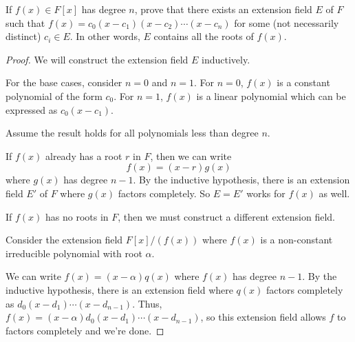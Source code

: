 \documentclass[../hw7]{subfiles}
\begin{document}
\begin{problem}
If $f(x) \in  F[x]$ has degree $n$, prove that there exists an extension field $E$  of $F$ such that
$f(x) = c_0(x - c_1)(x - c_2)\cdots(x - c_n)$ for some (not necessarily
distinct) $c_i \in E$. In other words, $E$  contains all the roots of $f(x)$.
\end{problem}
\begin{proof}
	We will construct the extension field $E$ inductively.

	For the base cases, consider $n=0$ and $n=1$.
	For $n=0$,  $f(x)$ is a constant polynomial of the form $c_0$.
	For $n=1$,  $f(x)$ is a linear polynomial which can be expressed as  $c_0(x-c_1)$.

	Assume the result holds for all polynomials less than degree $n$.

	If $f(x)$ already has a root $r$ in $F$, then we can write \[
		f(x) = (x - r)g(x)
	\] where $g(x)$ has degree $n-1$.
	By the inductive hypothesis, there is an extension field $E'$ of $F$  where $g(x)$ factors completely.
	So $E = E'$ works for $f(x)$ as well.

	If $f(x)$ has no roots in  $F$, then we must construct a different  extension field.

	Consider the extension field $F[x]/(f(x))$ where $f(x)$ is a non-constant irreducible polynomial with root $\alpha$.

	We can write $f(x)=(x-\alpha)q(x)$ where  $f(x)$ has degree  $n-1$.
	By the inductive hypothesis, there is an extension field where  $q(x)$ factors completely as $d_0(x-d_1)\cdots(x-d_{n-1})$.
	Thus, $f(x)=(x-\alpha)d_0(x-d_1)\cdots(x-d_{n-1})$, so this extension field allows $f$ to factors completely and we're done.
\end{proof}
\end{document}
